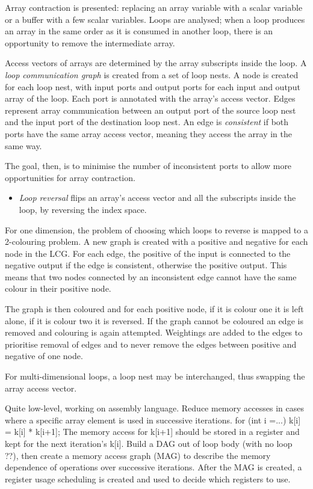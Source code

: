 Array contraction is presented: replacing an array variable with a scalar variable or a buffer with a few scalar variables.
Loops are analysed; when a loop produces an array in the same order as it is consumed in another loop, there is an opportunity to
remove the intermediate array.

Access vectors of arrays are determined by the array subscripts inside the loop.
A \emph{loop communication graph} is created from a set of loop nests. A node is created for each loop nest, with input ports and output ports for each input and output array of the loop. Each port is annotated with the array's access vector.
Edges represent array communication between an output port of the source loop nest and the input port of the destination loop nest.
An edge is \emph{consistent} if both ports have the same array access vector, meaning they access the array in the same way.

The goal, then, is to minimise the number of inconsistent ports to allow more opportunities for array contraction.
\begin{itemize}
\item
\emph{Loop reversal} flips an array's access vector and all the subscripts inside the loop, by reversing the index space.
\end{itemize}
For one dimension, the problem of choosing which loops to reverse is mapped to a 2-colouring problem.
A new graph is created with a positive and negative for each node in the LCG. For each edge, the positive of the input is connected to the negative output if the edge is consistent, otherwise the positive output.
This means that two nodes connected by an inconsistent edge cannot have the same colour in their positive node.

The graph is then coloured and for each positive node, if it is colour one it is left alone, if it is colour two it is reversed.
If the graph cannot be coloured an edge is removed and colouring is again attempted.
Weightings are added to the edges to prioritise removal of edges and to never remove the edges between positive and negative of one node.

For multi-dimensional loops, a loop nest may be interchanged, thus swapping the array access vector.


Quite low-level, working on assembly language.
Reduce memory accesses in cases where a specific array element is used in successive iterations.
  for (int i =...)
    k[i] = k[i] * k[i+1];
The memory access for k[i+1] should be stored in a register and kept for the next iteration's k[i].
Build a DAG out of loop body (with no loop ??), then create a memory access graph (MAG) to describe the memory dependence of operations over successive iterations.
After the MAG is created, a register usage scheduling is created and used to decide which registers to use.

